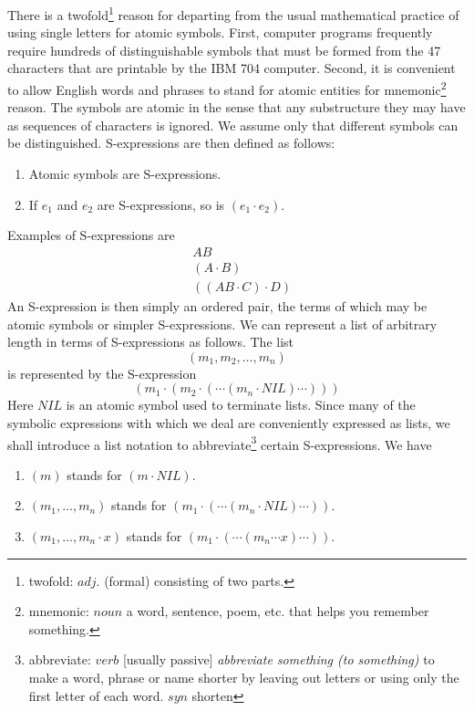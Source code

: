 \documentclass[11pt, a4paper]{article}
\begin{document}
There is a
twofold\footnote{twofold: $adj.$ (formal) consisting of two parts.}
reason for departing from the usual mathematical practice of
using single letters for atomic symbols. First, computer programs frequently
require hundreds of distinguishable symbols that must be formed from the 47
characters that are printable by the IBM 704 computer. Second, it is convenient
to allow English words and phrases to stand for atomic entities for
mnemonic\footnote{mnemonic: $noun$ a word, sentence, poem, etc. that helps you
  remember something.}
reason. The symbols are atomic in the sense that any substructure they may have
as sequences of characters is ignored. We assume only that different symbols can
be distinguished. S-expressions are then defined as follows:
\begin{enumerate}
\item Atomic symbols are S-expressions.
\item If $e_1$ and $e_2$ are S-expressions, so is $(e_1 \cdot e_2)$.
\end{enumerate}
Examples of S-expressions are
\begin{align*}
&AB          \\
&(A \cdot B) \\
&((AB \cdot C) \cdot D)
\end{align*}
An S-expression is then simply an ordered pair, the terms of which may be atomic
symbols or simpler S-expressions. We can represent a list of arbitrary length in
terms of S-expressions as follows. The list
$$ (m_1, m_2, \ldots, m_n) $$
is represented by the S-expression
$$ (m_1 \cdot (m_2 \cdot ( \cdots (m_n \cdot NIL) \cdots ))) $$
Here $NIL$ is an atomic symbol used to terminate lists. Since many of the
symbolic expressions with which we deal are conveniently expressed as lists, we
shall introduce a list notation to
abbreviate\footnote{abbreviate: $verb$ [usually passive] \textit{abbreviate
    something (to something)} to make a word, phrase or name shorter by leaving
  out letters or using only the first letter of each word. $syn$ shorten}
certain S-expressions. We have
\begin{enumerate}
\item $(m)$ stands for $(m \cdot NIL)$.
\item $(m_1, \ldots, m_n)$ stands for
  $(m_1 \cdot ( \cdots (m_n \cdot NIL) \cdots ))$.
\item $(m_1, \ldots, m_n \cdot x)$ stands for
  $(m_1 \cdot ( \cdots (m_n \cdots x) \cdots ))$.
\end{enumerate}
\end{document}
